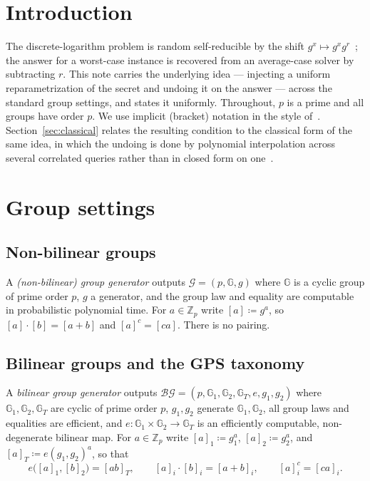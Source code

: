 \documentclass{conjura-solution}
\newcommand{\G}{\mathbb{G}}
\newcommand{\Gone}{\mathbb{G}_1}
\newcommand{\Gtwo}{\mathbb{G}_2}
\newcommand{\GT}{\mathbb{G}_T}
\newcommand{\Zp}{\mathbb{Z}_p}
\newcommand{\bg}{\mathcal{BG}}
\begin{document}
\section{Introduction}

The discrete-logarithm problem is random self-reducible by the shift $g^{x}\mapsto
g^{x}g^{r}$~\cite{TW87}; the answer for a worst-case instance is recovered from an
average-case solver by subtracting $r$. This note carries the underlying idea --- injecting a
uniform reparametrization of the secret and undoing it on the answer --- across the standard
group settings, and states it uniformly. Throughout, $p$ is a prime and all groups have
order $p$. We use implicit (bracket) notation in the style of~\cite{EHKRV13}.
Section~\ref{sec:classical} relates the resulting condition to the classical form of the
same idea, in which the undoing is done by polynomial interpolation across several
correlated queries rather than in closed form on one~\cite{Lipton91,FF93}.

\section{Group settings}

\subsection{Non-bilinear groups}

\begin{definition}
A \emph{(non-bilinear) group generator} outputs $\mathcal G=(p,\G,g)$ where $\G$ is a
cyclic group of prime order $p$, $g$ a generator, and the group law and equality are
computable in probabilistic polynomial time. For $a\in\Zp$ write $[a]\coloneqq g^{a}$, so
$[a]\cdot[b]=[a+b]$ and $[a]^{c}=[ca]$. There is no pairing.
\end{definition}

\subsection{Bilinear groups and the GPS taxonomy}

\begin{definition}
A \emph{bilinear group generator} outputs
$\bg=(p,\Gone,\Gtwo,\GT,e,g_1,g_2)$ where $\Gone,\Gtwo,\GT$ are cyclic of prime order $p$,
$g_1,g_2$ generate $\Gone,\Gtwo$, all group laws and equalities are efficient, and
$e\colon\Gone\times\Gtwo\to\GT$ is an efficiently computable, non-degenerate bilinear map.
For $a\in\Zp$ write $[a]_1\coloneqq g_1^{a}$, $[a]_2\coloneqq g_2^{a}$, and
$[a]_T\coloneqq e(g_1,g_2)^{a}$, so that
\[
  e\bigl([a]_1,[b]_2\bigr)=[ab]_T,\qquad [a]_i\cdot[b]_i=[a+b]_i,\qquad [a]_i^{c}=[ca]_i.
\]
\end{definition}
\end{document}

